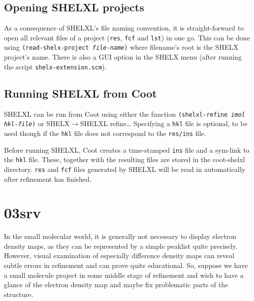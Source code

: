\documentclass{article}
\begin{document}
\subsection{Opening SHELXL projects} 

As a consequence of SHELXL's file naming convention, it is
straight-forward to open all relevant files of a project
(\texttt{res}, \texttt{fcf} and \texttt{lst}) in one go. This can be
done using \texttt{(read-shelx-project \emph{file-name})} where
filename's root is the SHELX project's name. There is also a GUI
option in the SHELX menu (after running the script
\texttt{shelx-extension.scm}).


\subsection{Running SHELXL from Coot}

SHELXL can be run from Coot using either the function
\texttt{(shelxl-refine \emph{imol hkl-file})} or
\textsf{SHELX$\to$SHELXL refine\ldots} Specifying a \texttt{hkl}
file is optional, to be used though if the \texttt{hkl} file does not
correspond to the \texttt{res/ins} file.

Before running SHELXL, Coot creates a time-stamped \texttt{ins} file
and a sym-link to the \texttt{hkl} file. These, together with the
resulting files are stored in the coot-shelxl directory. \texttt{res}
and \texttt{fcf} files generated by SHELXL will be read in
automatically after refinement has finished.


\section{03srv}

In the small molecular world, it is generally not necessary to display
electron density maps, as they can be represented by a simple peaklist
quite precisely. However, visual examination of especially difference
density maps can reveal subtle errors in refinement and can prove
quite educational. So, suppose we have a small molecule project in
some middle stage of refinement and wish to have a glance of the
electron density map and maybe fix problematic parts of the structure.
\end{document}
